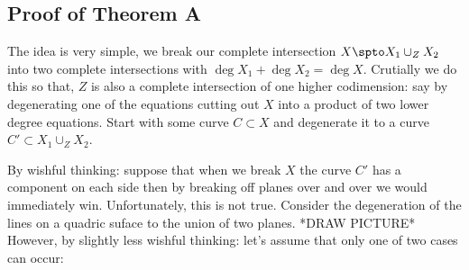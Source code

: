 \documentclass[12pt]{article}
\theoremstyle{plain}
\begin{document}
\subsection{Proof of Theorem A}

The idea is very simple, we break our complete intersection $X \spto X_1 \cup_Z X_2$ into two complete intersections with $\deg{X_1} + \deg{X_2} = \deg{X}$. {\color{red} Crutially we do this so that, $Z$ is also a complete intersection of one higher codimension: say by degenerating one of the equations cutting out $X$ into a product of two lower degree equations.} Start with some curve $C \subset X$ and degenerate it to a curve $C' \subset X_1 \cup_Z X_2$.
\par 
{\color{red} By wishful thinking: suppose that when we break $X$ the curve $C'$ has a component on each side then by breaking off planes over and over we would immediately win. Unfortunately, this is not true. Consider the degeneration of the lines on a quadric suface to the union of two planes. *DRAW PICTURE*}
\bigskip\\
{\color{red} However, by slightly less wishful thinking: let's assume that only one of two cases can occur:}
\end{document}
